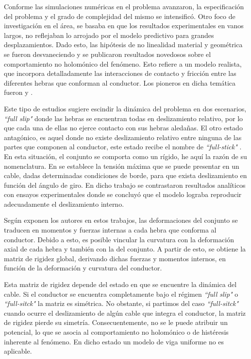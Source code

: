Conforme las simulaciones numéricas en el problema avanzaron, la especificación del problema y el grado de complejidad del mismo se intensificó. Otro foco de investigación en el área, se basaba en que los resultados experimentales en vanos largos, no reflejaban lo arrojado por el modelo predictivo para grandes desplazamientos. Dado esto, las hipótesis de no linealidad material y geométrica se fueron desvaneciendo y se publicaron resultados novedosos sobre el comportamiento no holomónico del fenómeno. Esto refiere a un modelo realista, que incorpora detalladamente las interacciones de contacto y fricción entre las diferentes hebras que conforman al conductor. Los pioneros en dicha temática fueron \cite {Papailiou1997} y \cite{Kutterer1992}.

Este tipo de estudios sugiere escindir la dinámica del problema en dos escenarios, \textit{``full slip"} donde las hebras se encuentran todas en deslizamiento relativo, por lo que cada una de ellas no ejerce contacto con sus hebras aledañas. El otro estado antagónico, es aquel donde no existe deslizamiento relativo entre ninguna de las partes que componen al conductor, este estado recibe el nombre de \textit{``full-stick" }. En esta situación, el conjunto se comporta como un rígido, he aquí la razón de su nomenclatura. En \cite {Papailiou1997} se establece la tensión máxima que se puede presentar en un cable, dadas determinadas condiciones de borde, para que exista deslizamiento en función del ángulo de giro. En dicho trabajo se contrastaron resultados analíticos con ensayos experimentales donde se concluyó que el modelo lograba reproducir adecuadamente el deslizamiento interno. 

Según exponen los autores en estos trabajos, las deformaciones del conjunto se traducen en momentos y fuerzas internas a cada hebra que conforma al conductor. Debido a esto, es posible vincular la curvatura con la deformación axial de cada hebra y también con la del conjunto. A partir de esto, se obtiene la matriz de rigidez global, derivando dichas fuerzas y momentos internos, en función de la deformación y curvatura del conductor.

Esta matriz de rigidez depende del estado en que se encuentre la dinámica del cable. Si el conductor se encuentra completamente bajo el régimen \textit{``full slip"} o  \textit{``full-sitck" } la matriz es simétrica. No obstante, si partimos del caso \textit{``full-sitck" } cuando ocurre el deslizamiento de algún cable que integra el conductor, la matriz de rigidez pierde su simetría. Consecuentemente, no se le puede atribuir un potencial, lo que se asocia al comportamiento no holomónico o de histéresis inherente al fenómeno. En dicho estado un modelo de viga uniforme no es aplicable.


